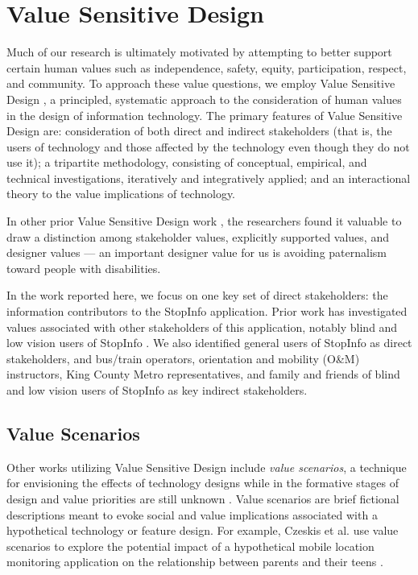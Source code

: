 \section{Value Sensitive Design}
\label{sec:vsd}

Much of our research is ultimately motivated by attempting to better
support certain human values such as independence, safety, equity,
participation, respect, and community.  To approach these value
questions, we employ Value Sensitive Design
\cite{friedman-amis-2006}, a principled, systematic approach to the
consideration of human values in the design of information technology. The primary features of Value Sensitive Design are: consideration of
both direct and indirect stakeholders (that is, the users of
technology and those affected by the technology even though they do
not use it); a tripartite methodology, consisting of conceptual,
empirical, and technical investigations, iteratively and integratively
applied; and an interactional theory to the value implications of
technology.

In other prior Value Sensitive
Design work \cite{borning-ecscw-2005,borning-chi-2012}, the
researchers found it valuable to draw a distinction among stakeholder
values, explicitly supported values, and designer values --- an
important designer value for us is avoiding paternalism toward people
with disabilities.

In the work reported here, we focus on one key set of direct
stakeholders: the information contributors to the StopInfo application. Prior work has investigated values associated with other stakeholders of this application, notably blind and low vision users of StopInfo \cite{campbell-2014}. We also identified general users of StopInfo as direct stakeholders, and bus/train operators, orientation and mobility (O\&M) instructors, King County Metro representatives, and family and friends of blind and low vision users of StopInfo as key indirect stakeholders.

\subsection{Value Scenarios}
Other works utilizing Value Sensitive Design include \emph{value scenarios}, a technique for envisioning the effects of technology designs while in the formative stages of design and value priorities are still unknown \cite{nathan-2007}. Value scenarios are brief fictional descriptions meant to evoke social and value implications associated with a hypothetical technology or feature design. For example, Czeskis et al. use value scenarios to explore the potential impact of a hypothetical mobile location monitoring application on the relationship between parents and their teens \cite{czeskis-2010}.

